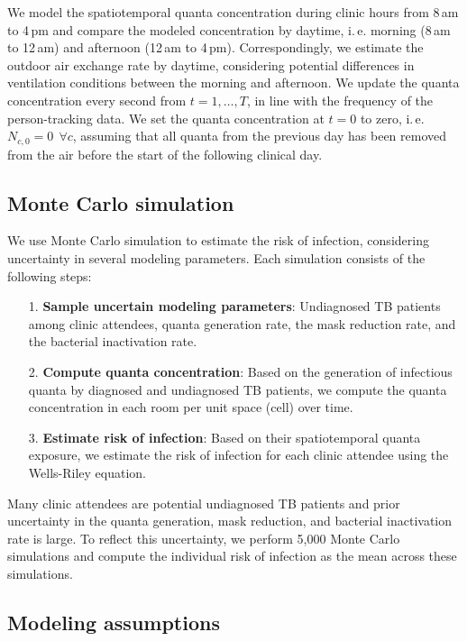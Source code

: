 \documentclass[fleqn,11pt]{wlscirep_supp}
\newcommand\ie{i.\,e.\xspace}
\begin{document}
We model the spatiotemporal quanta concentration during clinic hours from 8\,am to 4\,pm and compare the modeled concentration by daytime, \ie morning (8\,am to 12\,am) and afternoon (12\,am to 4\,pm). Correspondingly, we estimate the outdoor air exchange rate by daytime, considering potential differences in ventilation conditions between the morning and afternoon. We update the quanta concentration every second from $t = 1, \dots, T$, in line with the frequency of the person-tracking data. We set the quanta concentration at $t=0$ to zero, \ie $N_{c,0} = 0 ~~ \forall c$, assuming that all quanta from the previous day has been removed from the air before the start of the following clinical day. 


\subsection{Monte Carlo simulation}

We use Monte Carlo simulation to estimate the risk of infection, considering uncertainty in several modeling parameters. Each simulation consists of the following steps:
\begin{itemize}
    \item[1.] \textbf{Sample uncertain modeling parameters}: Undiagnosed TB patients among clinic attendees, quanta generation rate, the mask reduction rate, and the bacterial inactivation rate.
    \item[2.] \textbf{Compute quanta concentration}: Based on the generation of infectious quanta by diagnosed and undiagnosed TB patients, we compute the quanta concentration in each room per unit space (cell) over time.
    \item[3.] \textbf{Estimate risk of infection}: Based on their spatiotemporal quanta exposure, we estimate the risk of infection for each clinic attendee using the Wells-Riley equation.
\end{itemize}

Many clinic attendees are potential undiagnosed TB patients and prior uncertainty in the quanta generation, mask reduction, and bacterial inactivation rate is large. To reflect this uncertainty, we perform 5,000 Monte Carlo simulations and compute the individual risk of infection as the mean across these simulations.  

\subsection{Modeling assumptions}\label{sec:priors}
\end{document}
